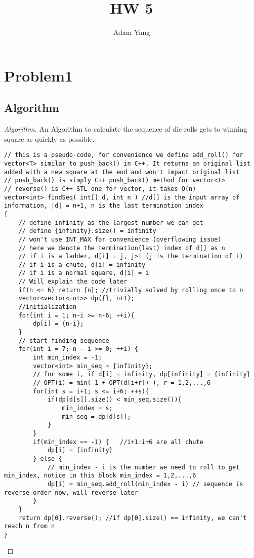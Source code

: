 \documentclass[openany]{article}
\begin{document}
\title{HW 5}
\author{Adam Yang}
\maketitle




\section*{Problem1}

\subsection*{Algorithm}
\begin{proof}[Algorithm]{}
		\renewcommand{\qedsymbol}{}
		An Algorithm to calculate the sequence of die rolls gets to winning square as quickly as possible.
		\begin{lstlisting}[basicstyle=\fontsize{8}{9}\selectfont\ttfamily]
// this is a pseudo-code, for convenience we define add_roll() for vector<T> similar to push_back() in C++. It returns an original list added with a new square at the end and won't impact original list
// push_back() is simply C++ push_back() method for vector<T>
// reverse() is C++ STL one for vector, it takes O(n)
vector<int> findSeq( int[] d, int n ) //d[] is the input array of information, |d| = n+1, n is the last termination index
{
    // define infinity as the largest number we can get
    // define {infinity}.size() = infinity
    // won't use INT_MAX for convenience (overflowing issue)
    // here we denote the termination(last) index of d[] as n
    // if i is a ladder, d[i] = j, j>i (j is the termination of i)
    // if i is a chute, d[i] = infinity
    // if i is a normal square, d[i] = i
    // Will explain the code later
    if(n <= 6) return {n}; //trivially solved by rolling once to n
    vector<vector<int>> dp({}, n+1);
    //initialization
    for(int i = 1; n-i >= n-6; ++i){
        dp[i] = {n-i};
    }
    // start finding sequence
    for(int i = 7; n - i >= 0; ++i) {
        int min_index = -1;
        vector<int> min_seq = {infinity};
        // for some i, if d[i] = infinity, dp[infinity] = {infinity}
        // OPT(i) = min( 1 + OPT(d[i+r]) ), r = 1,2,...,6
        for(int s = i+1; s <= i+6; ++s){
            if(dp[d[s]].size() < min_seq.size()){
                min_index = s;
                min_seq = dp[d[s]];
            }
        }
        if(min_index == -1) {   //i+1:i+6 are all chute
            dp[i] = {infinity}
        } else {
            // min_index - i is the number we need to roll to get min_index, notice in this block min_index = 1,2,...,6
            dp[i] = min_seq.add_roll(min_index - i) // sequence is reverse order now, will reverse later
        }
    }
    return dp[0].reverse(); //if dp[0].size() == infinity, we can't reach n from n
}
		\end{lstlisting} 
\end{proof}
\end{document}

